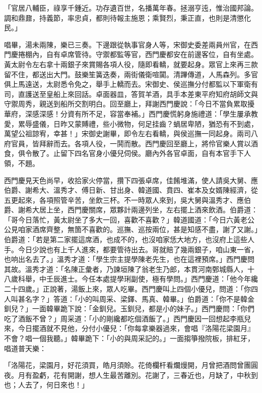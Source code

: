 「官居八輔臣，祿享千鍾近。功存遺百世，名播萬年春。拯溺亨迍，惟治國邦論。調和鼎鼐，持義節，率忠貞，都則待報主施恩；乘賢烈，秉正直，也則是清懲化民。」

唱畢，湯未兩陳，樂已三奏。下邊跟從執事官身人等，宋御史委差兩員州官，在西門慶捲棚內，自有卓席管待。守禦都監等官，西門慶都安在前邊客位，自有坐處。黃太尉令左右拿十兩銀子來賞賜各項人役，隨即看轎，就要起身。眾官上來再三款留不住，都送出大門。鼓樂笙簧迭奏，兩街儀衛喧闐。清蹕傳道，人馬森列。多官俱上馬遠送，太尉悉令免之，舉手上轎而去。宋御史、侯巡撫分付都監以下軍衛有司，直護送至皇船上來回話。卓面器皿，答賀羊酒，具手本差東平府知府胡師文與守禦周秀，親送到船所交割明白。回至廳上，拜謝西門慶說：「今日不當負累取擾華府，深感深感！分資有所不足，容當奉補。」西門慶慌躬身施禮道：「學生屢承教愛，累辱盛儀，日昨又蒙賻禮，些小微物，何足挂齒？蝸居卑陋，猶恐有不到處，萬望公祖諒宥，幸甚！」宋御史謝畢，即令左右看轎，與侯巡撫一同起身。兩司八府官員，皆拜辭而去。各項人役，一鬨而散。西門慶回至廳上，將伶官樂人賞以酒食，俱令散了。止留下四名官身小優兒伺侯。廳內外各官卓面，自有本官手下人領，不題。

西門慶見天色尚早，收拾家火停當，攢下四張卓席，佳餚堆滿，使人請吳大舅、應伯爵、謝希大、溫秀才、傅日新、甘出身、韓道國、賁四、崔本及女婿陳經濟，從五更起來，各項照管辛苦，坐飲三杯。不一時眾人來到，吳大舅與溫秀才、應伯爵、謝希大居上坐，西門慶關席，眾夥計兩邊列坐，左右擺上酒來飲酒。伯爵道：「哥今日落忙，黃太尉坐了多大一回，喜歡不喜歡？」韓道國道：「今日六黃老公公見咱家酒席齊整，無箇不喜歡的。巡撫、巡按兩位，甚是知感不盡，謝了又謝。」伯爵道：「若是第二家擺這席酒，也成不的，也沒咱家恁大地方，也沒府上這些人手。今日少說也有上千人進來，都要管待出去。哥就賠了幾兩銀子，咱山東一省，也响出名去了。」溫秀才道：「學生宗主提學陳老先生，也在這裡預席。」西門慶問其故。溫秀才道：「名陳正彙者，乃諫垣陳了翁老生乃郎，本貫河南鄄城縣人，十八歲科舉，中壬辰進士。今任本處提學琍副使，極有學問。」西門慶道：「他今年纔二十四歲。」正說著，湯飯上來，眾人吃畢。西門慶叫上四個小優兒，問道：「你四人叫甚名字？」答道：「小的叫周采、梁鐸、馬真、韓畢。」伯爵道：「你不是韓金釧兒？」一面韓畢跪下說：「金釧兒。玉釧兒，都是小的妹子。」西門慶問：「你們吃了酒飯不曾？」周采道：「小的剛纔都吃個酒飯了。」西門慶因一回想起李瓶兒來，今日擺酒就不見他，分付小優兒：「你每拿樂器過來，會唱『洛陽花梁園月』不會？唱一個我聽。」韓畢跪下：「小的與周采記的。」一面搊箏撥院板，排紅牙，唱道普天樂：

「洛陽花，梁園月，好花須買，皓月須賒。花倚欄杆看爛熳開，月曾把酒問曾團圓夜。月有盈虧，花有開謝，想人生最苦離別。花謝了，三春近也，月缺了，中秋到也；人去了，何日來也！」

